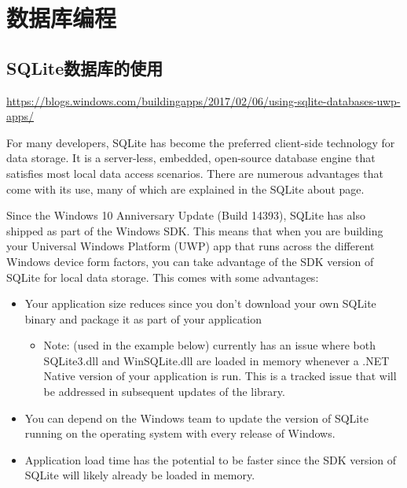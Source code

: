 \chapter{数据库编程}

\section{SQLite数据库的使用}

\url{https://blogs.windows.com/buildingapps/2017/02/06/using-sqlite-databases-uwp-apps/}

For many developers, SQLite has become the preferred client-side technology for data storage. It is a server-less, embedded, open-source database engine that satisfies most local data access scenarios. There are numerous advantages that come with its use, many of which are explained in the SQLite about page.

Since the Windows 10 Anniversary Update (Build 14393), SQLite has also shipped as part of the Windows SDK. This means that when you are building your Universal Windows Platform (UWP) app that runs across the different Windows device form factors, you can take advantage of the SDK version of SQLite for local data storage. This comes with some advantages:

\begin{itemize}
	\item Your application size reduces since you don’t download your own SQLite binary and package it as part of your application 

	\begin{itemize}
		\item Note:  (used in the example below) currently has an issue where both SQLite3.dll and WinSQLite.dll are loaded in memory whenever a .NET Native version of your application is run. This is a tracked issue that will be addressed in subsequent updates of the library. 
	\end{itemize}

	\item You can depend on the Windows team to update the version of SQLite running on the operating system with every release of Windows.
	
	\item Application load time has the potential to be faster since the SDK version of SQLite will likely already be loaded in memory.
\end{itemize}

